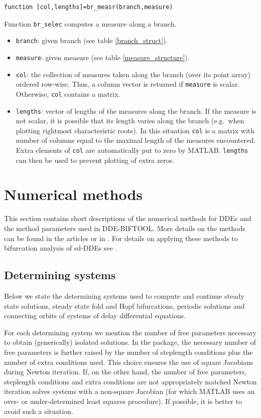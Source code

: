 \documentclass[10pt]{scrartcl}
\newcommand{\DDEBIFCODE}{\textsc{DDE-BIFTOOL}}
\newcommand{\blist}[1]{\mbox{\lstinline!#1!}}
\begin{document}
{\begin{lstlisting}
function [col,lengths]=br_measr(branch,measure)  
\end{lstlisting}
\noindent Function \blist{br_selec} computes a measure along a branch.
\begin{itemize}
\item \blist{branch}: given branch (see table \ref{branch_struct}).
\item \blist{measure}: given measure (see table \ref{measure_structure}).
\item \blist{col}: the collection of measures taken along the
branch (over its point array) ordered row-wise. Thus, a column vector
is returned if \blist{measure} is scalar. Otherwise,
\blist{col} contains a matrix.
\item \blist{lengths}: vector of lengths of the measures along the
  branch.  If the measure is not scalar, it is possible that its
  length varies along the branch (e.g.~when plotting rightmost
  characteristic roots). In this situation \blist{col} is a matrix
  with number of columns equal to the maximal length of the measures
  encountered.  Extra elements of \blist{col} are automatically put to
  zero by MATLAB.  \blist{lengths} can then be used to prevent
  plotting of extra zeros.
\end{itemize}

\section{Numerical methods}\label{numerical_methods}\label{code_num_methods}
This section contains short descriptions of the numerical methods 
for DDEs and the method parameters used in {\DDEBIFCODE}. 
More details on the methods can be found in the
articles \cite{Luzy96,Enge99a,Enge99b,en_d01,engel01,homoclinic} 
or in \cite{Enge00}. For details on applying these methods to bifurcation
analysis of sd-DDEs see \cite{luz01}.

\subsection{Determining systems}\label{determining_systems}

Below we state the determining systems used to compute and
continue steady state solutions, steady state fold and Hopf 
bifurcations, periodic solutions and connecting orbits of systems of delay
differential equations.

For each determining system we mention the number of free 
parameters necessary to obtain (generically) isolated 
solutions. 
In the package,
the necessary number of free parameters
is further raised by the number of
steplength conditions plus the number of extra conditions used.
This choice ensures 
the use of square Jacobians during Newton iteration. 
If, on the other hand, the number of free parameters, 
steplength conditions and extra conditions
are not appropriately matched Newton iteration solves systems with a   
non-square Jacobian (for which MATLAB uses an
over- or under-determined
least squares procedure). 
If possible, it is better to avoid such a situation.

}
\end{document}
